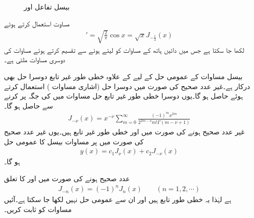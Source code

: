 %
\begin{figure}
\centering
{}
\caption{بیسل تفاعل  اور }
\label{شکل_بیسل_کسری_بیسل}
\end{figure}

مساوت  استعمال کرتے ہوئے
\begin{align*}
[\sqrt{x}J_{\tfrac{1}{2}}(x)]'=\sqrt{\frac{2}{\pi}}\cos x=\sqrt{x}J_{-\tfrac{1}{2}}(x)
\end{align*} 
لکھا جا سکتا ہے جس میں دائیں ہاتھ کے مساوات کو لیتے ہوئے  سے تقسیم کرتے ہوئے مساوات  کی دوسری مساوات ملتی ہے۔

بیسل مساوات  کے عمومی حل کے لیے  کے علاوہ خطی طور غیر تابع دوسرا حل بھی درکار ہے۔غیر عدد صحیح  کی صورت میں دوسرا حل   (اشاری مساوات ) استعمال کرتے ہوئے حاصل ہو گا۔یوں دوسرا خطی طور غیر تابع حل مساوات  میں  کی جگہ  پر کرنے سے حاصل ہو گا۔
\begin{align}\label{مساوات_بیسل_تسلسل_عمومی_دوسرا}
J_{-\nu}(x)=x^{-\nu}\sum_{m=0}^{\infty}\frac{(-1)^m x^{2m}}{2^{2m-\nu}m!\Gamma(m-\nu+1)}
\end{align}
 غیر عدد صحیح ہونے کی صورت میں  اور  خطی طور غیر تابع ہیں۔یوں غیر عدد صحیح  کی صورت میں  پر  مساوات بیسل کا عمومی حل 
\begin{align}
y(x)=c_1J_{\nu}(x)+c_2J_{-\nu}(x)
\end{align}
ہو گا۔ 

 عدد صحیح ہونے کی صورت میں  اور  کا تعلق
\begin{align}\label{مساوات_بیسل_عدد_صحیح_بیسل_تعلق}
J_{-n}(x)=(-1)^nJ_n(x) \quad \quad (n=1,2,\cdots)
\end{align}
ہے لہٰذا یہ خطی طور تابع ہیں اور ان سے عمومی حل نہیں لکھا جا سکتا ہے۔آئیں مساوات  کو ثابت کریں۔

